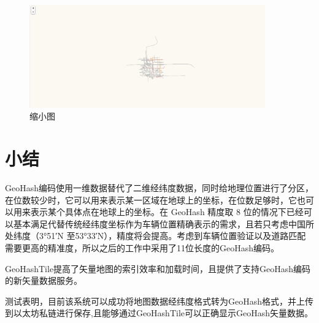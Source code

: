 \begin{enumerate}
    \begin{figure}[!htb]
        \centering
        \includegraphics[width=4in]{images/12.png}
        \caption{缩小图}\label{缩小图} %
    \end{figure}
\end{enumerate}

\section{小结}
GeoHash编码使用一维数据替代了二维经纬度数据，同时给地理位置进行了分区，在位数较少时，它可以用来表示某一区域在地球上的坐标，在位数足够时，它也可以用来表示某个具体点在地球上的坐标。在 GeoHash 精度取 8 位的情况下已经可以基本满足代替传统经纬度坐标作为车辆位置精确表示的需求，且若只考虑中国所处纬度（3°51′N 至53°33′N），精度将会提高\cite{lposition}。考虑到车辆位置验证以及道路匹配需要更高的精准度，所以之后的工作中采用了11位长度的GeoHash编码。

GeoHashTile提高了矢量地图的索引效率和加载时间，且提供了支持GeoHash编码的新矢量数据服务。

测试表明，目前该系统可以成功将地图数据经纬度格式转为GeoHash格式，并上传到以太坊私链进行保存,且能够通过GeoHashTile可以正确显示GeoHash矢量数据。